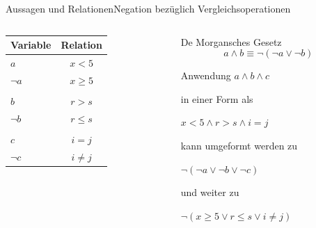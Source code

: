 \documentclass[xelatex,aspectratio=169]{beamer}
\begin{document}
\begin{frame}{Aussagen und Relationen}{Negation bezüglich Vergleichsoperationen}
  \begin{columns}
    \begin{column}{0.3\textwidth}
      \centering
      \begin{tabular}{lc}
        \toprule
        \textbf{Variable} & \textbf{Relation} \\
        \midrule
        $a$               & $x < 5$           \\
        $\lnot a$         & $x \geq 5$        \\
        \\
        $b$               & $r > s$           \\
        $\lnot b$         & $r \leq s$        \\
        \\
        $c$               & $i = j$           \\
        $\lnot c$         & $i \neq j$        \\
        \bottomrule
      \end{tabular}
    \end{column}
    \begin{column}{0.7\textwidth}
      \begin{block}{De Morgansches Gesetz}
        \[ a \land b \equiv \lnot (\lnot a \lor \lnot b) \]

      \end{block}

      \begin{exampleblock}{Anwendung}
        \centering
        \( a \land b \land c \)

        in einer Form als

        \( x < 5 \land r > s \land i = j \)

        kann umgeformt werden zu

        \( \lnot ( \lnot a  \lor \lnot b \lor \lnot c) \)

        und weiter zu

        \( \lnot (x \geq 5 \lor r \leq s \lor i \neq j) \)
      \end{exampleblock}
    \end{column}
  \end{columns}

\end{frame}
\end{document}
